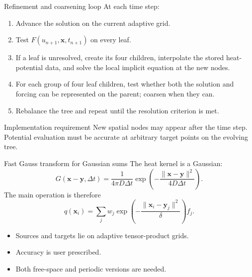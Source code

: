\documentclass[aspectratio=169,10pt]{beamer}
\newcommand{\x}{\bm{x}}
\newcommand{\y}{\bm{y}}
\newcommand{\dt}{\Delta t}
\begin{document}
\begin{frame}{Refinement and coarsening loop}
\small
At each time step:
\begin{enumerate}
  \item Advance the solution on the current adaptive grid.
  \item Test $F(u_{n+1},\x,t_{n+1})$ on every leaf.
  \item If a leaf is unresolved, create its four children, interpolate the
  stored heat-potential data, and solve the local implicit equation at the
  new nodes.
  \item For each group of four leaf children, test whether both the solution
  and forcing can be represented on the parent; coarsen when they can.
  \item Rebalance the tree and repeat until the resolution criterion is met.
\end{enumerate}

\begin{block}{Implementation requirement}
New spatial nodes may appear after the time step. Potential evaluation must
be accurate at arbitrary target points on the evolving tree.
\end{block}
\end{frame}

\begin{frame}{Fast Gauss transform for Gaussian sums}
\small
The heat kernel is a Gaussian:
\[
  G(\x-\y,\dt)
  =\frac{1}{4\pi D\dt}
  \exp\left(-\frac{\|\x-\y\|^2}{4D\dt}\right).
\]
The main operation is therefore
\[
  q(\x_i)=\sum_j w_j
  \exp\left(-\frac{\|\x_i-\y_j\|^2}{\delta}\right)f_j.
\]

\begin{itemize}
  \item Sources and targets lie on adaptive tensor-product grids.
  \item Accuracy is user prescribed.
  \item Both free-space and periodic versions are needed.
\end{itemize}
\end{frame}
\end{document}
